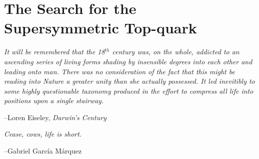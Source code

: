 \chapter{The Search for the Supersymmetric Top-quark}
\label{chap:search_stop}

\epigraph{
\textit{It will be remembered that the 18$^{th}$ century was, on the whole,
addicted to an ascending series of living forms shading by insensible degrees
into each other and leading onto man.
There was no consideration of the fact that this might be reading into Nature a greater
unity than she actually possessed. It led inevitibly to some highly
questionable taxonomy produced in the effort to compress all life into positions upon a
single stairway.}
}
{
--Loren Eiseley, \textit{Darwin's Century}
}



\epigraph{
\textit{Cease, cows, life is short.}
}
{
--Gabriel Garc\'{i}a M\'{a}rquez
}
